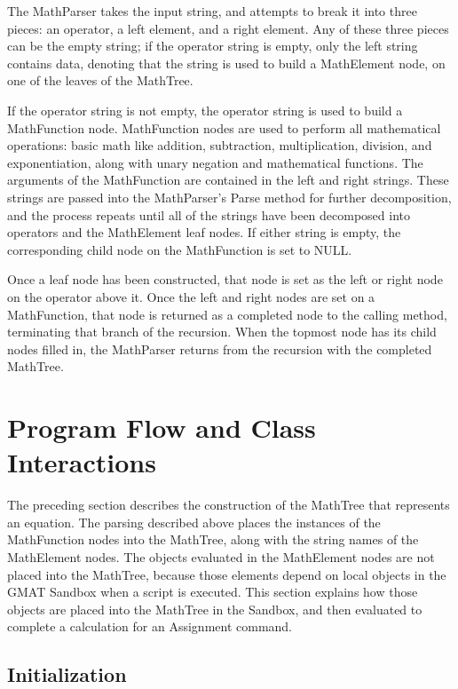 The MathParser takes the input string, and attempts to break it into three
pieces: an operator, a left element, and a right element.  Any of these three
pieces can be the empty string; if the operator string is empty, only the left
string contains data, denoting that the string is used to build a MathElement
node, on one of the leaves of the MathTree.

If the operator string is not empty, the operator string is used to build a
MathFunction node.  MathFunction nodes are used to perform all mathematical
operations: basic math like addition, subtraction, multiplication, division,
and exponentiation, along with unary negation and mathematical functions.  The
arguments of the MathFunction are contained in the left and right strings.
These strings are passed into the MathParser's Parse method for further
decomposition, and the process repeats until all of the strings have been
decomposed into operators and the MathElement leaf nodes.  If either string is
empty, the corresponding child node on the MathFunction is set to NULL.

Once a leaf node has been constructed, that node is set as the left or right
node on the operator above it.  Once the left and right nodes are set on a
MathFunction, that node is returned as a completed node to the calling method,
terminating that branch of the recursion.  When the topmost node has its child
nodes filled in, the MathParser returns from the recursion with the completed
MathTree.

\section{Program Flow and Class Interactions}

The preceding section describes the construction of the MathTree that
represents an equation. The parsing described above places the instances of the
MathFunction nodes into the MathTree, along with the string names of the
MathElement nodes.  The objects evaluated in the MathElement nodes are not
placed into the MathTree, because those elements depend on local objects in the
GMAT Sandbox when a script is executed.  This section explains how those
objects are placed into the MathTree in the Sandbox, and then evaluated to
complete a calculation for an Assignment command.

\subsection{Initialization}

